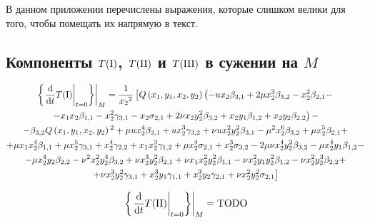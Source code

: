 \documentclass[../main.tex]{subfiles}
\begin{document}
\setcounter{equation}{0}
\renewcommand{\theequation}{П1.\arabic{equation}}
В данном приложении перечислены выражения, которые слишком велики для того, чтобы помещать их напрямую в текст.

\subsection{Компоненты $T(\mathrm{\RN{1}})$, $T(\mathrm{\RN{2}})$ и $T(\mathrm{\RN{3}})$ в сужении на $M$}
\begin{multline}\label{eq:appendix_t1}
\left.\left\{ \left.\frac{\mathrm d}{\mathrm{d}t}T(\mathrm{\RN{1}})\right|_{t = 0}\right\} \right|_M = \frac{1}{{x_2}^2}\left[Q\left(x_1,y_1,x_2,y_2\right) \left(-u x_2 \beta_{3,1}+2 \mu  x_2^3 \beta_{3,2}-x_2^2 \beta _{2,1} - \right.\right. \\ 
\left. -x_1 x_2 \beta_{1,1} -x_2^2 \gamma_{3,1}-x_2\sigma_{2,1} + 2 \nu  x_2 y_2^2 \beta_{3,2}+x_2 y_1 \beta _{1,2}+x_2 y_2 \beta_{2,2}\right) - \\
- \beta_{3,2} Q\left(x_1,y_1,x_2,y_2\right){}^2 + \mu  u x_2^4 \beta _{3,1}+u x_2^3 \gamma _{3,2}+\nu  u x_2^2 y_2^2 \beta _{3,1}-\mu ^2 x_2^6 \beta_{3,2}+\mu  x_2^5 \beta _{2,1} + \\
+ \mu  x_1 x_2^4 \beta_{1,1}+\mu  x_2^5 \gamma _{3,1}+x_2^4 \gamma _{2,2}+x_1 x_2^3 \gamma _{1,2}+\mu  x_2^4 \sigma _{2,1}+x_2^3 \sigma _{3,2}-2 \mu  \nu  x_2^4 y_2^2 \beta _{3,2}-\mu  x_2^4 y_1 \beta _{1,2} - \\
- \mu  x_2^4 y_2 \beta _{2,2}-\nu ^2 x_2^2 y_2^4 \beta _{3,2}+\nu  x_2^3 y_2^2 \beta _{2,1}+\nu  x_1 x_2^2 y_2^2 \beta _{1,1}-\nu  x_2^2 y_1 y_2^2 \beta _{1,2}-\nu  x_2^2 y_2^3 \beta _{2,2} +\\
\left.+\nu  x_2^3 y_2^2 \gamma _{3,1}+x_2^3 y_1 \gamma_{1,1}+x_2^3 y_2 \gamma _{2,1}+\nu  x_2^2 y_2^2 \sigma _{2,1}\right]
\end{multline}

\begin{multline}\label{eq:appendix_t2}
\left.\left\{ \left.\frac{\mathrm d}{\mathrm{d}t}T(\mathrm{\RN{2}})\right|_{t = 0}\right\} \right|_M = \textrm{TODO}
\end{multline}
\end{document}
